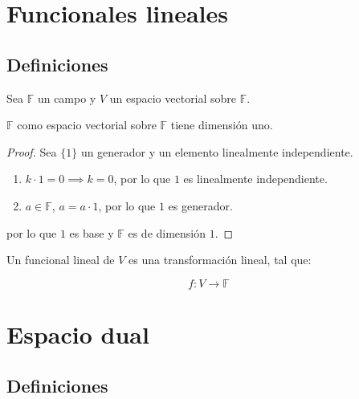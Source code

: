 \newpage
\section{Funcionales lineales}

	\subsection{Definiciones}

		\begin{lema}
			Sea $\mathbb{F}$ un campo y $V$ un espacio vectorial sobre $\mathbb{F}$.

			$\mathbb{F}$ como espacio vectorial sobre $\mathbb{F}$ tiene dimensión uno.
		\end{lema}

		\begin{proof}
			Sea $\{1\}$ un generador y un elemento linealmente independiente.

			\begin{enumerate}
				\item $k \cdot 1 = 0 \implies k = 0$, por lo que $1$ es linealmente independiente.
				\item $a \in \mathbb{F}$, $a = a \cdot 1$, por lo que $1$ es generador.
			\end{enumerate}

			por lo que $1$ es base y $\mathbb{F}$ es de dimensión $1$.
		\end{proof}

		\begin{definicion}
			Un funcional lineal de $V$ es una transformación lineal, tal que:

			\begin{equation}
				f \colon V \to \mathbb{F}
			\end{equation}
		\end{definicion}

\newpage
\section{Espacio dual}

	\subsection{Definiciones}

